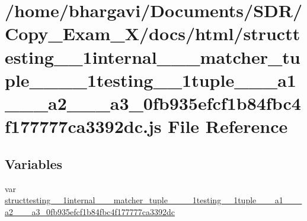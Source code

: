 \hypertarget{structtesting__1__1internal__1__1__matcher__tuple__3__01__1__1testing__1__1tuple__3__01__a1__00_bac46e360afc29ff8c6ce55b94400c6a}{}\section{/home/bhargavi/\+Documents/\+S\+D\+R/\+Copy\+\_\+\+Exam\+\_\+X/docs/html/structtesting\+\_\+\_\+1internal\+\_\+\_\+\_\+matcher\+\_\+tuple\+\_\+\_\+\_\+\_\+1testing\+\_\+\_\+1tuple\+\_\+\_\+\_\+a1\+\_\+\_\+\_\+a2\+\_\+\_\+\_\+a3\+\_\+0fb935efcf1b84fbc4f177777ca3392dc.js File Reference}
\label{structtesting__1__1internal__1__1__matcher__tuple__3__01__1__1testing__1__1tuple__3__01__a1__00_bac46e360afc29ff8c6ce55b94400c6a}
\subsection*{Variables}
\begin{DoxyCompactItemize}
\item 
var \hyperlink{structtesting__1__1internal__1__1__matcher__tuple__3__01__1__1testing__1__1tuple__3__01__a1__00_bac46e360afc29ff8c6ce55b94400c6a_a1122a0b67a07d8ed361e2ecafa846396}{structtesting\+\_\+\_\+1internal\+\_\+\_\+\_\+matcher\+\_\+tuple\+\_\+\_\+\_\+\_\+1testing\+\_\+\_\+1tuple\+\_\+\_\+\_\+a1\+\_\+\_\+\_\+a2\+\_\+\_\+\_\+a3\+\_\+0fb935efcf1b84fbc4f177777ca3392dc}
\end{DoxyCompactItemize}


